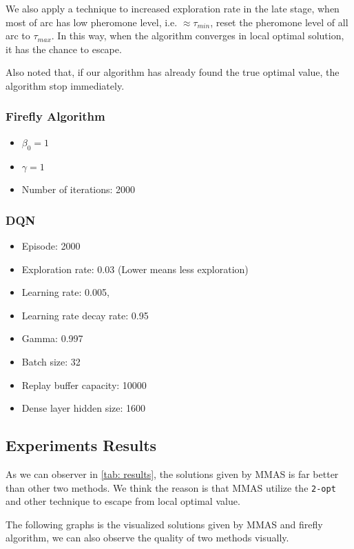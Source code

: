 \documentclass[twocolumn, a4paper]{extarticle}
\begin{document}
We also apply a technique to increased exploration rate in the late stage, when most of arc has low pheromone level, i.e. $\approx \tau_{min}$, reset the pheromone level of all arc to $\tau_{max}$. In this way, when the algorithm converges in local optimal solution, it has the chance to escape.

Also noted that, if our algorithm has already found the true optimal value, the algorithm stop immediately.

\subsubsection{Firefly Algorithm}

\begin{itemize}
	\item $\beta_0=1$
	\item $\gamma=1$
	\item Number of iterations: 2000
\end{itemize}


\subsubsection{DQN}

\begin{itemize}
	\item Episode: 2000
	\item Exploration rate: 0.03 (Lower means less exploration)
	\item Learning rate: 0.005,
	\item Learning rate decay rate: 0.95
	\item Gamma: 0.997
	\item Batch size: 32
	\item Replay buffer capacity: 10000
	\item Dense layer hidden size: 1600
\end{itemize}


\subsection{Experiments Results}

As we can observer in \autoref{tab: results}, the solutions given by MMAS is far better than other two methods. We think the reason is that MMAS utilize the \texttt{2-opt} and other technique to escape from local optimal value.

The following graphs is the visualized solutions given by MMAS and firefly algorithm, we can also observe the quality of two methods visually.
\end{document}
